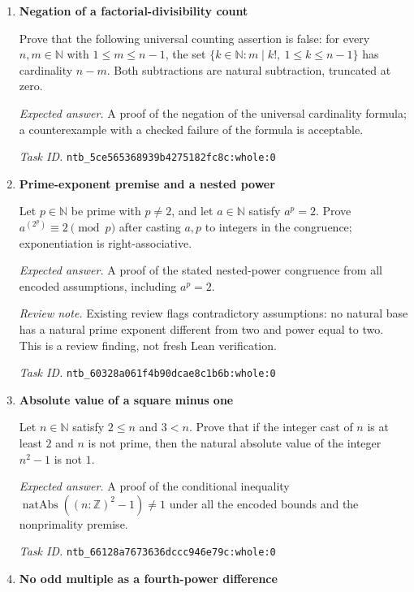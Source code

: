 \documentclass[11pt]{article}
\newcommand{\pth}[1]{\nolinkurl{#1}}
\begin{document}
\begin{enumerate}[label={DEV \arabic*.},leftmargin=4.5em,itemsep=1em]
\emph{Task ID.} \pth{ntb_57b89c0669597337e6ce5691:whole:0}

\item \textbf{Negation of a factorial-divisibility count}\label{qn:dev:16}

Prove that the following universal counting assertion is false: for every $n,m\in\mathbb N$ with $1\le m\le n-1$, the set $\{k\in\mathbb N:m\mid k!,\ 1\le k\le n-1\}$ has cardinality $n-m$. Both subtractions are natural subtraction, truncated at zero.

\emph{Expected answer.} A proof of the negation of the universal cardinality formula; a counterexample with a checked failure of the formula is acceptable.

\emph{Task ID.} \pth{ntb_5ce565368939b4275182fc8c:whole:0}

\item \textbf{Prime-exponent premise and a nested power}\label{qn:dev:17}

Let $p\in\mathbb N$ be prime with $p\ne2$, and let $a\in\mathbb N$ satisfy $a^p=2$. Prove $a^{(2^p)}\equiv2\pmod p$ after casting $a,p$ to integers in the congruence; exponentiation is right-associative.

\emph{Expected answer.} A proof of the stated nested-power congruence from all encoded assumptions, including $a^p=2$.

\emph{Review note.} Existing review flags contradictory assumptions: no natural base has a natural prime exponent different from two and power equal to two. This is a review finding, not fresh Lean verification.

\emph{Task ID.} \pth{ntb_60328a061f4b90dcae8c1b6b:whole:0}

\item \textbf{Absolute value of a square minus one}\label{qn:dev:18}

Let $n\in\mathbb N$ satisfy $2\le n$ and $3<n$. Prove that if the integer cast of $n$ is at least $2$ and $n$ is not prime, then the natural absolute value of the integer $n^2-1$ is not $1$.

\emph{Expected answer.} A proof of the conditional inequality $\operatorname{natAbs}((n:\mathbb Z)^2-1)\ne1$ under all the encoded bounds and the nonprimality premise.

\emph{Task ID.} \pth{ntb_66128a7673636dccc946e79c:whole:0}

\item \textbf{No odd multiple as a fourth-power difference}\label{qn:dev:19}


\end{enumerate}
\end{document}
